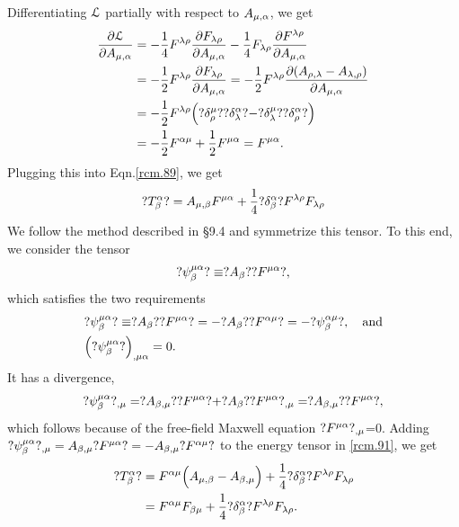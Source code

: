 Differentiating $\EuScript{L}$  partially with respect to 
$A_{{\mu},{\alpha}}$, we get
\begin{align}\label{rcm.90}
\frac{{\partial} \EuScript{L}}{{\partial} A_{{\mu},{\alpha}}}
&=-\frac{1}{4}F^{{\lambda}{\rho}}\frac{{\partial} F_{{\lambda}{\rho}} }
{{\partial} A_{{\mu},{\alpha}}}-\frac{1}{4}F_{{\lambda}{\rho}}\frac{{\partial}
F^{{\lambda}{\rho}} }{{\partial} A_{{\mu},{\alpha}}}\notag\\
&=-\frac{1}{2}F^{{\lambda}{\rho}}\frac{{\partial} F_{{\lambda}{\rho}} } {{\partial} 
A_{{\mu},{\alpha}}}=-\frac{1}{2}F^{{\lambda}{\rho}}\frac{{\partial}(A_{{\rho}, 
{\lambda}} -A_{{\lambda},{\rho}})} {{\partial} A_{{\mu},{\alpha}}}\notag\\
&=-\frac{1}{2}F^{{\lambda}{\rho}}
\Big(?\delta^{{\mu}}_{{\rho}}? 
?\delta^{{\alpha}}_{{\lambda}}?-?\delta^{{\mu}}_{{\lambda}}?
?\delta^{{\alpha}}_{{\rho}}?\Big)\notag\\
&=-\frac{1}{2}F^{{\alpha}{\mu}}
+\frac{1}{2}F^{{\mu}{\alpha}}=F^{{\mu}{\alpha}}.
\end{align}
Plugging this into Eqn.\eqref{rcm.89}, we get 
\begin{align}\label{rcm.91}
?T^{{\alpha}}_{{\beta}}?
=A_{{\mu},{\beta}}F^{{\mu}{\alpha}}
+\frac{1}{4}?\delta^{{\alpha}}_{{\beta}}? 
F^{{\lambda}{\rho}}F_{{\lambda}{\rho}}
\end{align}
We follow the method described in \S9.4 and symmetrize this
tensor. To this end, we consider the tensor
\begin{align}\label{rcm.92}
?{\psi}_{{\beta}}^{{\mu}{\alpha}}? 
\equiv ?A_{{\beta}}??F^{{\mu}{\alpha}}?,
\end{align}
which satisfies the two requirements
\begin{align}\label{rcm.93}
&?{\psi}_{{\beta}}^{{\mu}{\alpha}}? \equiv
?A_{{\beta}}??F^{{\mu}{\alpha}}?=-?A_{{\beta}}? 
?F^{{\alpha}{\mu}}?=-?{\psi}_{ {\beta} }^{{\alpha}{\mu}}?, \quad 
\text{and}\notag\\
&\Big(?{\psi}_{{\beta}}^{{\mu}{\alpha}}?\Big)_{,{\mu}{\alpha}}=0.
\end{align}
It has a divergence,
\begin{align}\label{rcm.94}
?{\psi}_{{\beta}}^{{\mu}{\alpha}}?_{,{\mu}}=?A_{{\beta},{\mu}}?
?F^{{\mu}{\alpha}}?+?A_{{\beta}}? ?F^{{\mu}{\alpha}}?_{,{\mu}}
=?A_{{\beta},{\mu}}? ?F^{{\mu}{\alpha}}?,
\end{align}
which follows because of the free-field Maxwell equation 
$?F^{{\mu}{\alpha}}?_{,{\mu}}$=0. Adding
$?{\psi}_{{\beta}}^{{\mu}{\alpha}}?_{,{\mu}}=A_{{\beta},{\mu}}
?F^{{\mu}{\alpha}}?=-A_{{\beta},{\mu}}
?F^{{\alpha}{\mu}}?$ to the energy tensor in \eqref{rcm.91}, we 
get
\begin{align}\label{rcm.95}
?T^{{\alpha}}_{{\beta}}? &=F^{{\alpha}{\mu}}\Big(A_{{\mu},{\beta}}
-A_{{\beta},{\mu}}\Big) +\frac{1}{4}?\delta^{{\alpha}}_{{\beta}}?
F^{{\lambda}{\rho}}F_{{\lambda}{\rho}}\notag\\
&=F^{{\alpha}{\mu}}F_{{\beta}{\mu}}
+\frac{1}{4}?\delta^{{\alpha}}_{{\beta}}? F^{{\lambda}{\rho}}F_{{\lambda}{\rho}}.
\end{align}
